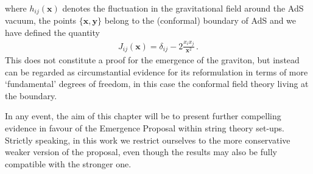 %
where $h_{i j} (\mathbf{x})$ denotes the fluctuation in the gravitational field around the AdS vacuum, the points $\{\mathbf{x}, \mathbf{y} \}$ belong to the (conformal) boundary of AdS and we have defined the quantity
%
\begin{align}
J_{ij} (\mathbf{x}) = \delta_{ij} - 2 \frac{x_i x_j}{\mathbf{x}^2}\, .
\end{align}
%
This does not constitute a proof for the emergence of the graviton, but instead can be regarded as circumstantial evidence for its reformulation in terms of more `fundamental' degrees of freedom, in this case the conformal field theory living at the boundary. 
 
In any event, the aim of this chapter will be to present further compelling evidence in favour of the Emergence Proposal within string theory set-ups. Strictly speaking, in this work we restrict ourselves to the more conservative weaker version of the proposal, even though the results may also be fully compatible with the stronger one.

